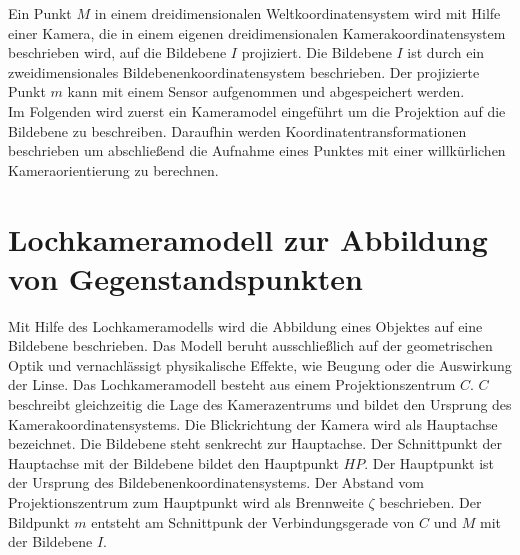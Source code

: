 Ein Punkt $M$ in einem dreidimensionalen Weltkoordinatensystem wird mit Hilfe einer Kamera, die in einem eigenen dreidimensionalen Kamerakoordinatensystem beschrieben wird, auf die Bildebene $I$ projiziert. Die Bildebene $I$ ist durch ein zweidimensionales Bildebenenkoordinatensystem beschrieben. Der projizierte Punkt $m$ kann mit einem Sensor aufgenommen und abgespeichert werden.  \\ 

Im Folgenden wird zuerst ein Kameramodel eingeführt um die Projektion auf die Bildebene zu beschreiben. Daraufhin werden Koordinatentransformationen beschrieben um abschließend die Aufnahme eines Punktes mit einer willkürlichen Kameraorientierung zu berechnen. 


\section{Lochkameramodell zur Abbildung von Gegenstandspunkten}

Mit Hilfe des Lochkameramodells wird die Abbildung eines Objektes auf eine Bildebene beschrieben. Das Modell beruht ausschließlich auf der geometrischen Optik und vernachlässigt physikalische Effekte, wie Beugung oder die Auswirkung der Linse\cite{Heipke}. Das Lochkameramodell besteht aus einem Projektionszentrum $C$. $C$ beschreibt gleichzeitig die Lage des Kamerazentrums und bildet den Ursprung des Kamerakoordinatensystems\cite{CamerModels.,HZ}. Die Blickrichtung der Kamera wird als Hauptachse bezeichnet. Die Bildebene steht senkrecht zur Hauptachse. Der Schnittpunkt der Hauptachse mit der Bildebene bildet den Hauptpunkt $HP$. Der Hauptpunkt ist der Ursprung des Bildebenenkoordinatensystems. Der Abstand vom Projektionszentrum zum Hauptpunkt wird als Brennweite $\zeta$ beschrieben\cite{HZ,CamerModels.}. Der Bildpunkt $m$ entsteht am Schnittpunk der Verbindungsgerade von $C$ und $M$ mit der Bildebene $I$. 



